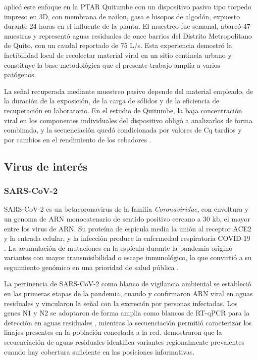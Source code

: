  aplicó este enfoque en la PTAR Quitumbe con un dispositivo pasivo tipo torpedo impreso en 3D, con membrana de nailon, gasa e hisopos de algodón, expuesto durante 24 horas en el influente de la planta. El muestreo fue semanal, abarcó 47 muestras y representó aguas residuales de once barrios del Distrito Metropolitano de Quito, con un caudal reportado de 75 L/s. Esta experiencia demostró la factibilidad local de recolectar material viral en un sitio centinela urbano y constituye la base metodológica que el presente trabajo amplía a varios patógenos.

La señal recuperada mediante muestreo pasivo depende del material empleado, de la duración de la exposición, de la carga de sólidos y de la eficiencia de recuperación en laboratorio. En el estudio de Quitumbe, la baja concentración viral en los componentes individuales del dispositivo obligó a analizarlos de forma combinada, y la secuenciación quedó condicionada por valores de Cq tardíos y por cambios en el rendimiento de los cebadores \cite{MejiaCalle_2024}. 

\subsection{Virus de interés}

\subsubsection{SARS-CoV-2}

SARS-CoV-2 es un betacoronavirus de la familia \textit{Coronaviridae}, con envoltura y un genoma de ARN monocatenario de sentido positivo cercano a 30 kb, el mayor entre los virus de ARN. Su proteína de espícula media la unión al receptor ACE2 y la entrada celular, y la infección produce la enfermedad respiratoria COVID-19 \cite{Murray_2021}. La acumulación de mutaciones en la espícula durante la pandemia originó variantes con mayor transmisibilidad o escape inmunológico, lo que convirtió a su seguimiento genómico en una prioridad de salud pública \cite{Karthikeyan_2022}.

La pertinencia de SARS-CoV-2 como blanco de vigilancia ambiental se estableció en las primeras etapas de la pandemia, cuando  y  confirmaron ARN viral en aguas residuales y vincularon la señal con la excreción por personas infectadas. Los genes N1 y N2 se adoptaron de forma amplia como blancos de RT-qPCR para la detección en aguas residuales \cite{Ahmed_2020}, mientras la secuenciación permitió caracterizar los linajes presentes en la población conectada a la red.  demostraron que la secuenciación de aguas residuales identifica variantes regionalmente prevalentes cuando hay cobertura suficiente en las posiciones informativas.

